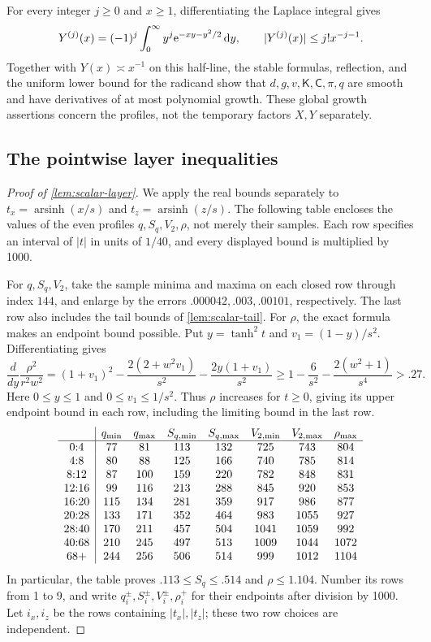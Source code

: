 For every integer $j\ge0$ and $x\ge1$, differentiating the Laplace integral gives
\[
 Y^{(j)}(x)=(-1)^j\int_0^\infty y^j \mathrm{e}^{-xy-y^2/2}\,\mathrm{d} y,
 \qquad |Y^{(j)}(x)|\le j!x^{-j-1}.
\]
Together with $Y(x)\asymp x^{-1}$ on this half-line, the stable formulas, reflection, and the uniform lower bound for the radicand show that $d,g,v,\mathsf K,\mathsf C,\pi,q$ are smooth and have derivatives of at most polynomial growth. These global growth assertions concern the profiles, not the temporary factors $X,Y$ separately.


\subsection{The pointwise layer inequalities}

\begin{proof}[Proof of \cref{lem:scalar-layer}]
We apply the real bounds separately to $t_x=\operatorname{arsinh}(x/s)$ and $t_z=\operatorname{arsinh}(z/s)$. The following table encloses the values of the even profiles $q,S_q,V_2,\rho$, not merely their samples. Each row specifies an interval of $|t|$ in units of $1/40$, and every displayed bound is multiplied by 1000.

For $q,S_q,V_2$, take the sample minima and maxima on each closed row through index $144$, and enlarge by the errors $.000042,.003,.00101$, respectively. The last row also includes the tail bounds of \cref{lem:scalar-tail}. For $\rho$, the exact formula makes an endpoint bound possible. Put $y=\tanh^2t$ and $v_1=(1-y)/s^2$. Differentiating gives
\[
 \frac{d}{dy}\frac{\rho^2}{r^2w^2}
 =(1+v_1)^2-\frac{2(2+w^2v_1)}{s^2}
             -\frac{2y(1+v_1)}{s^2}
 \ge1-\frac6{s^2}-\frac{2(w^2+1)}{s^4}>.27.
\]
Here $0\le y\le1$ and $0\le v_1\le1/s^2$. Thus $\rho$ increases for $t\ge0$, giving its upper endpoint bound in each row, including the limiting bound in the last row.
\[
\begin{array}{c|cc cc cc c}
 & q_{\min}&q_{\max}& S_{q,\min}& S_{q,\max}& V_{2,\min}& V_{2,\max}& \rho_{\max}\\\hline
 0{:}4&77&81&113&132&725&743&804\\
 4{:}8&80&88&125&166&740&785&814\\
 8{:}12&87&100&159&220&782&848&831\\
 12{:}16&99&116&213&288&845&920&853\\
 16{:}20&115&134&281&359&917&986&877\\
 20{:}28&133&171&352&464&983&1055&927\\
 28{:}40&170&211&457&504&1041&1059&992\\
 40{:}68&210&245&497&513&1009&1044&1072\\
 68{+}&244&256&506&514&999&1012&1104
\end{array}
\]
In particular, the table proves $.113\le S_q\le.514$ and $\rho\le1.104$. Number its rows from 1 to 9, and write $q_i^\pm,S_i^\pm,V_i^\pm,\rho_i^+$ for their endpoints after division by 1000. Let $i_x,i_z$ be the rows containing $|t_x|,|t_z|$; these two row choices are independent.


\end{proof}
